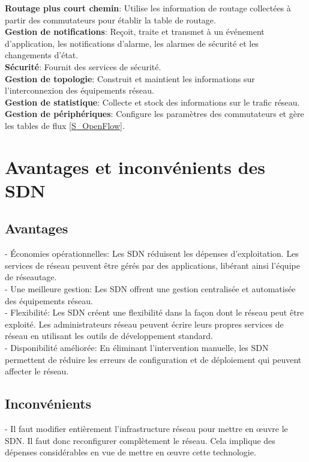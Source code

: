 \noindent\textbf{Routage plus court chemin}: Utilise les information de routage collectées à partir des commutateurs pour établir la table de routage.\\
\textbf{Gestion de notifications}: Reçoit, traite et transmet à un événement d’application, les notifications d’alarme, les alarmes de sécurité et les changements d’état.\\
\textbf{Sécurité}: Fournit des services de sécurité.\\
\textbf{Gestion de topologie}: Construit et maintient les informations sur l'interconnexion des équipements réseau.\\
\textbf{Gestion de statistique}: Collecte et stock des informations sur le trafic réseau.\\
\textbf{Gestion de périphériques}: Configure les paramètres des commutateurs et gère les tables de flux \autoref{S_OpenFlow}.
 

\section{Avantages et inconvénients des SDN}
\subsection{Avantages}
\noindent - Économies opérationnelles: Les SDN réduisent les dépenses d’exploitation. Les services de réseau peuvent être gérés par des applications, libérant ainsi l’équipe de réseautage.\\

\noindent - Une meilleure gestion: Les SDN offrent une gestion centralisée et automatisée des équipements réseau.\\

\noindent - Flexibilité: Les SDN créent une flexibilité dans la façon dont le réseau peut être exploité. Les administrateurs réseau peuvent écrire leurs propres services de réseau en utilisant les outils de développement standard.\\

\noindent - Disponibilité améliorée: En éliminant l’intervention manuelle, les SDN permettent de réduire les erreurs de configuration et de déploiement qui peuvent affecter le réseau. 

\subsection{Inconvénients}
\noindent - Il faut modifier entièrement l’infrastructure réseau  pour mettre en œuvre le SDN. Il faut donc reconfigurer complètement le réseau. Cela implique des dépenses considérables en vue de mettre en œuvre cette technologie.\\

